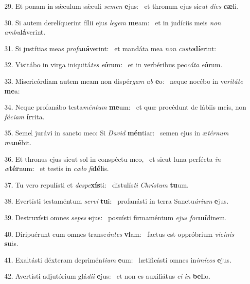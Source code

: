 29. Et ponam in sǽculum sǽculi \textit{se}\textit{men} \textbf{e}jus: \ast\  et thronum ejus sic\textit{ut} \textit{di}\textit{es} \textbf{cæ}li.\

30. Si autem derelíquerint fílii ejus \textit{le}\textit{gem} \textbf{me}am: \ast\  et in judíciis meis \textit{non} \textit{am}\textit{bu}\textbf{lá}verint.\

31. Si justítias meas \textit{pro}\textit{fa}\textbf{ná}verint: \ast\  et mandáta mea \textit{non} \textit{cus}\textit{to}\textbf{dí}erint:\

32. Visitábo in virga iniquitá\textit{tes} \textit{e}\textbf{ó}rum: \ast\  et in verbéribus pec\textit{cá}\textit{ta} \textit{e}\textbf{ó}rum.\

33. Misericórdiam autem meam non dispér\textit{gam} \textit{ab} \textbf{e}o: \ast\  neque nocébo in ve\textit{ri}\textit{tá}\textit{te} \textbf{me}a:\

34. Neque profanábo testa\textit{mén}\textit{tum} \textbf{me}um: \ast\  et quæ procédunt de lábiis meis, non \textit{fá}\textit{ci}\textit{am} \textbf{ír}rita.\

35. Semel jurávi in sancto meo: Si \textit{Da}\textit{vid} \textbf{mén}tiar: \ast\  semen ejus in æ\textit{tér}\textit{num} \textit{ma}\textbf{né}bit.\

36. Et thronus ejus sicut sol in conspéctu meo, \dag\  et sicut luna perfécta \textit{in} \textit{æ}\textbf{tér}num: \ast\  et testis in \textit{cæ}\textit{lo} \textit{fi}\textbf{dé}lis.\

37. Tu vero repulísti et \textit{de}\textit{spe}\textbf{xís}ti: \ast\  distulís\textit{ti} \textit{Chris}\textit{tum} \textbf{tu}um.\

38. Evertísti testaméntum \textit{ser}\textit{vi} \textbf{tu}i: \ast\  profanásti in terra Sanctu\textit{á}\textit{ri}\textit{um} \textbf{e}jus.\

39. Destruxísti omnes \textit{se}\textit{pes} \textbf{e}jus: \ast\  posuísti firmaméntum \textit{e}\textit{jus} \textit{for}\textbf{mí}dinem.\

40. Diripuérunt eum omnes transe\textit{ún}\textit{tes} \textbf{vi}am: \ast\  factus est oppróbrium \textit{vi}\textit{cí}\textit{nis} \textbf{su}is.\

41. Exaltásti déxteram deprimén\textit{ti}\textit{um} \textbf{e}um: \ast\  lætificásti omnes in\textit{i}\textit{mí}\textit{cos} \textbf{e}jus.\

42. Avertísti adjutórium glá\textit{di}\textit{i} \textbf{e}jus: \ast\  et non es auxiliátus \textit{e}\textit{i} \textit{in} \textbf{bel}lo.\

